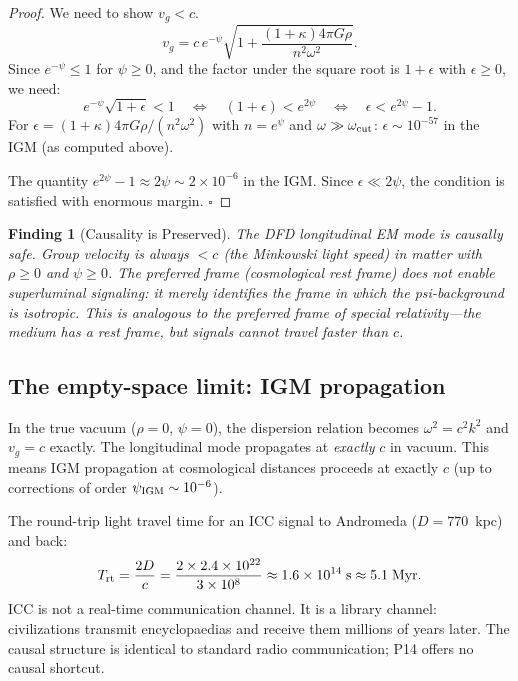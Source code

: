\documentclass[11pt]{article}
\newtheorem{finding}{Finding}
\newcommand{\ee}[1]{\times 10^{#1}}
\begin{document}
\begin{proof}
We need to show $v_g < c$.
\begin{equation}
v_g = c\,e^{-\psi}\sqrt{1 + \frac{(1+\kappa)4\pi G\rho}{n^2\omega^2}}.
\end{equation}
Since $e^{-\psi} \leq 1$ for $\psi \geq 0$, and the factor under
the square root is $1 + \epsilon$ with $\epsilon \geq 0$, we need:
\begin{equation}
e^{-\psi}\sqrt{1+\epsilon} < 1 \quad \Leftrightarrow \quad
(1+\epsilon) < e^{2\psi} \quad \Leftrightarrow \quad
\epsilon < e^{2\psi} - 1.
\end{equation}
For $\epsilon = (1+\kappa)4\pi G\rho/(n^2\omega^2)$ with
$n = e^\psi$ and $\omega \gg \omega_{\rm cut}$:
$\epsilon \sim 10^{-57}$ in the IGM (as computed above).

The quantity $e^{2\psi} - 1 \approx 2\psi \sim 2 \times 10^{-6}$
in the IGM. Since $\epsilon \ll 2\psi$, the condition is satisfied
with enormous margin. $\square$
\end{proof}

\begin{finding}[Causality is Preserved]
The DFD longitudinal EM mode is causally safe. Group velocity is
always $< c$ (the Minkowski light speed) in matter with $\rho \geq 0$
and $\psi \geq 0$. The preferred frame (cosmological rest frame)
does \textit{not} enable superluminal signaling: it merely identifies
the frame in which the psi-background is isotropic. This is
analogous to the preferred frame of special relativity---the
medium has a rest frame, but signals cannot travel faster than $c$.
\end{finding}

\subsection{The empty-space limit: IGM propagation}

In the true vacuum ($\rho = 0$, $\psi = 0$), the dispersion
relation becomes $\omega^2 = c^2 k^2$ and $v_g = c$ exactly.
The longitudinal mode propagates at \textit{exactly} $c$ in vacuum.
This means IGM propagation at cosmological distances proceeds at
exactly $c$ (up to corrections of order $\psi_{\rm IGM} \sim 10^{-6}$).

The round-trip light travel time for an ICC signal to Andromeda
($D = 770$~kpc) and back:
\begin{equation}
T_{\rm rt} = \frac{2D}{c} = \frac{2 \times 2.4\ee{22}}{3\ee{8}} \approx 1.6\ee{14}\;\text{s} \approx 5.1\;\text{Myr}.
\end{equation}
ICC is not a real-time communication channel. It is a library
channel: civilizations transmit encyclopaedias and receive them
millions of years later. The causal structure is identical to
standard radio communication; P14 offers no causal shortcut.
\end{document}
